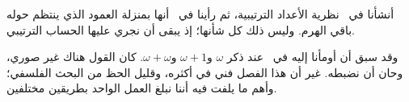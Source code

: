 \documentclass[../../../include/open-logic-section]{subfiles}
\begin{document}


أنشأنا في~ نظرية الأعداد الترتيبية، ثم رأينا
في~ أنها بمنزلة العمود الذي ينتظم حوله باقي
الهرم. وليس ذلك كل شأنها؛ إذ يبقى أن نجري عليها الحساب الترتيبي.

وقد سبق أن أومأنا إليه في~ عند ذكر
$\omega$ و$\omega+1$ و$\omega+\omega$. كان القول هناك غير صوري،
وحان أن نضبطه. غير أن هذا الفصل فني في أكثره، وقليل الحظ من البحث
الفلسفي؛ وأهم ما يلفت فيه أننا نبلغ العمل الواحد بطريقين مختلفين.
\end{document}
